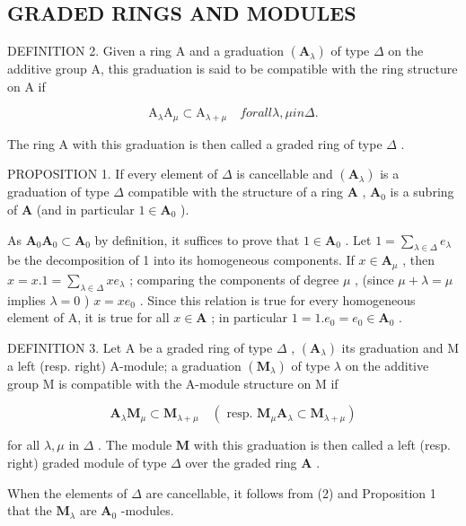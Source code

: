 \subsection{GRADED RINGS AND MODULES}

DEFINITION 2. Given a ring A and a graduation \((\mathbf{A}_{\lambda})\) of type \(\Delta\) on the additive group A, this graduation is said to be compatible with the ring structure on A if

\[
\mathrm{A} _ {\lambda} \mathrm{A} _ {\mu} \subset \mathrm{A} _ {\lambda + \mu} \quad f o r a l l \lambda , \mu i n \Delta .\tag{1}
\]

The ring A with this graduation is then called a graded ring of type \(\Delta\) .

PROPOSITION 1. If every element of \(\Delta\) is cancellable and \((\mathbf{A}_{\lambda})\) is a graduation of type \(\Delta\) compatible with the structure of a ring \(\mathbf{A}\) , \(\mathbf{A}_0\) is a subring of \(\mathbf{A}\) (and in particular \(1 \in \mathbf{A}_0\) ).

As \(\mathbf{A}_0\mathbf{A}_0\subset \mathbf{A}_0\) by definition, it suffices to prove that \(1\in \mathbf{A}_0\) . Let \(1 = \sum_{\lambda \in \Delta}e_{\lambda}\) be the decomposition of 1 into its homogeneous components. If \(x\in \mathbf{A}_{\mu}\) , then \(x = x.1 = \sum_{\lambda \in \Delta}xe_{\lambda}\) ; comparing the components of degree \(\mu\) , (since \(\mu +\lambda = \mu\) implies \(\lambda = 0\) ) \(x = xe_0\) . Since this relation is true for every homogeneous element of A, it is true for all \(x\in \mathbf{A}\) ; in particular \(1 = 1.e_0 = e_0\in \mathbf{A}_0\) .

DEFINITION 3. Let A be a graded ring of type \(\Delta\) , \((\mathbf{A}_{\lambda})\) its graduation and M a left (resp. right) A-module; a graduation \((\mathbf{M}_{\lambda})\) of type \(\lambda\) on the additive group M is compatible with the A-module structure on M if

\[
\mathbf {A} _ {\lambda} \mathbf {M} _ {\mu} \subset \mathbf {M} _ {\lambda + \mu} \quad (\text { resp. } \mathbf {M} _ {\mu} \mathbf {A} _ {\lambda} \subset \mathbf {M} _ {\lambda + \mu})\tag{2}
\]

for all \(\lambda, \mu\) in \(\Delta\) . The module \(\mathbf{M}\) with this graduation is then called a left (resp. right) graded module of type \(\Delta\) over the graded ring \(\mathbf{A}\) .

When the elements of \(\Delta\) are cancellable, it follows from (2) and Proposition 1 that the \(\mathbf{M}_{\lambda}\) are \(\mathbf{A}_0\) -modules.

